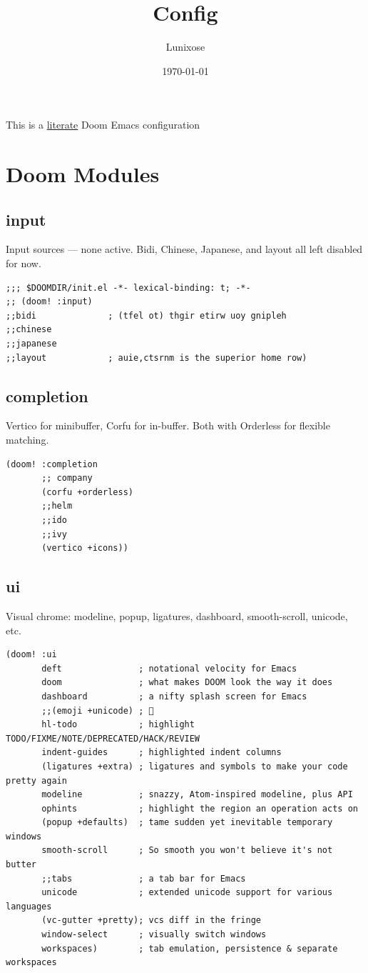 \documentclass[11pt]{article}
\author{Lunixose}
\date{\today}
\title{Config}
\begin{document}
\maketitle
\tableofcontents

This is a \href{https://en.wikipedia.org/wiki/Literate\_programming}{literate} Doom Emacs configuration
\section{Doom Modules}
\label{sec:orgace259a}
\subsection{input}
\label{sec:org34a78f3}
Input sources — none active. Bidi, Chinese, Japanese, and layout all
left disabled for now.

\begin{verbatim}
;;; $DOOMDIR/init.el -*- lexical-binding: t; -*-
;; (doom! :input)
;;bidi              ; (tfel ot) thgir etirw uoy gnipleh
;;chinese
;;japanese
;;layout            ; auie,ctsrnm is the superior home row)
\end{verbatim}
\subsection{completion}
\label{sec:org16881ec}
Vertico for minibuffer, Corfu for in-buffer. Both with Orderless for
flexible matching.

\begin{verbatim}
(doom! :completion
       ;; company
       (corfu +orderless)
       ;;helm
       ;;ido
       ;;ivy
       (vertico +icons))
\end{verbatim}
\subsection{ui}
\label{sec:org7fefa92}
Visual chrome: modeline, popup, ligatures, dashboard, smooth-scroll,
unicode, etc.

\begin{verbatim}
(doom! :ui
       deft               ; notational velocity for Emacs
       doom               ; what makes DOOM look the way it does
       dashboard          ; a nifty splash screen for Emacs
       ;;(emoji +unicode) ; 🙂
       hl-todo            ; highlight TODO/FIXME/NOTE/DEPRECATED/HACK/REVIEW
       indent-guides      ; highlighted indent columns
       (ligatures +extra) ; ligatures and symbols to make your code pretty again
       modeline           ; snazzy, Atom-inspired modeline, plus API
       ophints            ; highlight the region an operation acts on
       (popup +defaults)  ; tame sudden yet inevitable temporary windows
       smooth-scroll      ; So smooth you won't believe it's not butter
       ;;tabs             ; a tab bar for Emacs
       unicode            ; extended unicode support for various languages
       (vc-gutter +pretty); vcs diff in the fringe
       window-select      ; visually switch windows
       workspaces)        ; tab emulation, persistence & separate workspaces
\end{verbatim}
\end{document}
